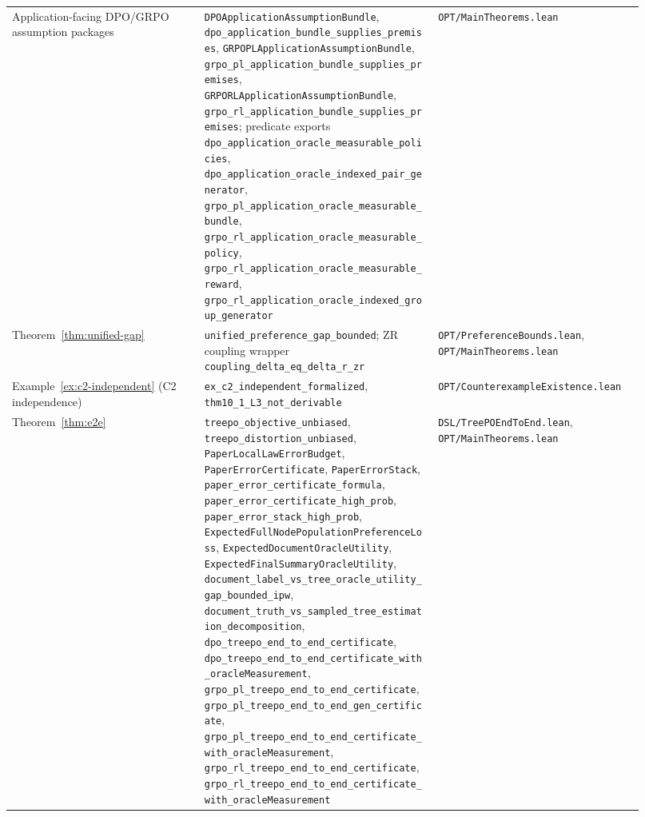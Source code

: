 {\begin{longtable}{p{0.28\linewidth}p{0.34\linewidth}p{0.30\linewidth}}
Application-facing DPO/GRPO assumption packages &
\texttt{DPOApplicationAssumptionBundle}, \texttt{dpo\_application\_bundle\_supplies\_premises}, \texttt{GRPOPLApplicationAssumptionBundle}, \texttt{grpo\_pl\_application\_bundle\_supplies\_premises}, \texttt{GRPORLApplicationAssumptionBundle}, \texttt{grpo\_rl\_application\_bundle\_supplies\_premises}; predicate exports \texttt{dpo\_application\_oracle\_measurable\_policies}, \texttt{dpo\_application\_oracle\_indexed\_pair\_generator}, \texttt{grpo\_pl\_application\_oracle\_measurable\_bundle}, \texttt{grpo\_rl\_application\_oracle\_measurable\_policy}, \texttt{grpo\_rl\_application\_oracle\_measurable\_reward}, \texttt{grpo\_rl\_application\_oracle\_indexed\_group\_generator} &
\texttt{OPT/MainTheorems.lean} \\

Theorem~\ref{thm:unified-gap} &
\texttt{unified\_preference\_gap\_bounded}; ZR coupling wrapper \texttt{coupling\_delta\_eq\_delta\_r\_zr} &
\texttt{OPT/PreferenceBounds.lean}, \texttt{OPT/MainTheorems.lean} \\

Example~\ref{ex:c2-independent} (C2 independence) &
\texttt{ex\_c2\_independent\_formalized}, \texttt{thm10\_1\_L3\_not\_derivable} &
\texttt{OPT/CounterexampleExistence.lean} \\

Theorem~\ref{thm:e2e} &
\texttt{treepo\_objective\_unbiased}, \texttt{treepo\_distortion\_unbiased}, \texttt{PaperLocalLawErrorBudget}, \texttt{PaperErrorCertificate}, \texttt{PaperErrorStack}, \texttt{paper\_error\_certificate\_formula}, \texttt{paper\_error\_certificate\_high\_prob}, \texttt{paper\_error\_stack\_high\_prob}, \texttt{ExpectedFullNodePopulationPreferenceLoss}, \texttt{ExpectedDocumentOracleUtility}, \texttt{ExpectedFinalSummaryOracleUtility}, \texttt{document\_label\_vs\_tree\_oracle\_utility\_gap\_bounded\_ipw}, \texttt{document\_truth\_vs\_sampled\_tree\_estimation\_decomposition}, \texttt{dpo\_treepo\_end\_to\_end\_certificate}, \texttt{dpo\_treepo\_end\_to\_end\_certificate\_with\_oracleMeasurement}, \texttt{grpo\_pl\_treepo\_end\_to\_end\_certificate}, \texttt{grpo\_pl\_treepo\_end\_to\_end\_gen\_certificate}, \texttt{grpo\_pl\_treepo\_end\_to\_end\_certificate\_with\_oracleMeasurement}, \texttt{grpo\_rl\_treepo\_end\_to\_end\_certificate}, \texttt{grpo\_rl\_treepo\_end\_to\_end\_certificate\_with\_oracleMeasurement} &
\texttt{DSL/TreePOEndToEnd.lean}, \texttt{OPT/MainTheorems.lean} \\


\end{longtable}}
